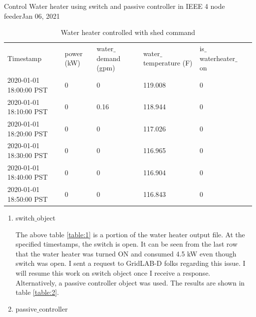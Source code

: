 \begin{entry}{Control Water heater using switch and passive controller in IEEE 4 node feeder}{Jan 06, 2021}
\begin{enumerate}
        \begin{table}[h]
        \begin{tabular}{|l|l|l|l|l|l}
        \cline{1-5}
        Timestamp & power (kW) & water$\_$demand (gpm) & water$\_$temperature (F) & is$\_$waterheater$\_$on & \\ \cline{1-5}
        2020-01-01 18:00:00 PST & 0 & 0 & 119.008 & 0 & \\ \cline{1-5}
        2020-01-01 18:10:00 PST & 0 & 0.16 & 118.944 & 0 &  \\ \cline{1-5}
        2020-01-01 18:20:00 PST & 0 & 0 & 117.026 & 0 &  \\ \cline{1-5}
        2020-01-01 18:30:00 PST & 0 & 0 & 116.965 & 0 &  \\ \cline{1-5}
        2020-01-01 18:40:00 PST & 0 & 0 & 116.904 & 0 &  \\ \cline{1-5}
        2020-01-01 18:50:00 PST & 0 & 0 & 116.843 & 0 &  \\
        \cline{1-5}
        \end{tabular}
        \caption{Water heater controlled with shed command}
        \label{table:3}
        \end{table}
    \end{enumerate}
    \results
    \begin{enumerate}
        \item switch$\_$object

        The above table \ref{table:1} is a portion of the water heater output file. At the specified timestamps, the switch is open. It can be seen from the last row that the water heater was turned ON and consumed 4.5 kW even though switch was open. I sent a request to GridLAB-D folks regarding this issue. I will resume this work on switch object once I receive a response. Alternatively, a passive controller object was used. The results are shown in table \ref{table:2}.
    
        \item passive$\_$controller
        

\end{enumerate}
\end{entry}
